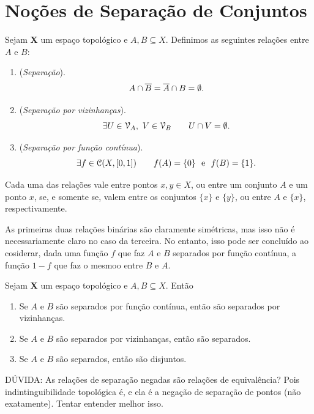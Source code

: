 \section{Noções de Separação de Conjuntos}

\begin{defi}
	Sejam $\bm X$ um espaço topológico e $A,B \subseteq X$. Definimos as seguintes relações entre $A$ e $B$:
	\begin{enumerate}
	\item (\emph{Separação}).
	\begin{equation*}
	A \cap \overline{B} = \overline{A} \cap B = \emptyset.
	\end{equation*}
	\item (\emph{Separação por vizinhanças}).
	\begin{equation*}
	\exists U \in \mathcal{V}_A,\ V \in \mathcal{V}_B \qquad U \cap V = \emptyset.
	\end{equation*}
	\item (\emph{Separação por função contínua}).
	\begin{equation*}
	\exists f \in \mathcal{C}(X,[0,1]) \qquad f(A)=\{0\} \text{\ \ e\ \ } f(B)=\{1\}.
	\end{equation*}
	\end{enumerate}
Cada uma das relações vale entre pontos $x,y \in X$, ou entre um conjunto $A$ e um ponto $x$, se, e somente se, valem entre os conjuntos $\{x\}$ e $\{y\}$, ou entre $A$ e $\{x\}$, respectivamente.
\end{defi}

	As primeiras duas relações binárias são claramente simétricas, mas isso não é necessariamente claro no caso da terceira. No entanto, isso pode ser concluído ao cosiderar, dada uma função $f$ que faz $A$ e $B$ separados por função contínua, a função $1-f$ que faz o mesmoo entre $B$ e $A$.

\begin{prop}
	Sejam $\bm X$ um espaço topológico e $A,B \subseteq X$. Então
	\begin{enumerate}
	\item Se $A$ e $B$ são separados por função contínua, então são separados por vizinhanças.
	\item Se $A$ e $B$ são separados por vizinhanças, então são separados.
	\item Se $A$ e $B$ são separados, então são disjuntos.
	\end{enumerate}
\end{prop}

DÚVIDA: As relações de separação negadas são relações de equivalência? Pois indintinguibilidade topológica é, e ela é a negação de separação de pontos (não exatamente). Tentar entender melhor isso.


